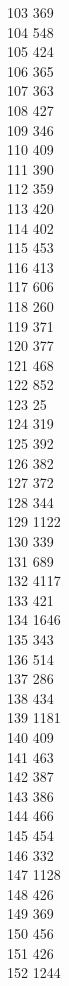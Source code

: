 { 103	369 \\
 104	548 \\
 105	424 \\
 106	365 \\
 107	363 \\
 108	427 \\
 109	346 \\
 110	409 \\
 111	390 \\
 112	359 \\
 113	420 \\
 114	402 \\
 115	453 \\
 116	413 \\
 117	606 \\
 118	260 \\
 119	371 \\
 120	377 \\
 121	468 \\
 122	852 \\
 123	25 \\
 124	319 \\
 125	392 \\
 126	382 \\
 127	372 \\
 128	344 \\
 129	1122 \\
 130	339 \\
 131	689 \\
 132	4117 \\
 133	421 \\
 134	1646 \\
 135	343 \\
 136	514 \\
 137	286 \\
 138	434 \\
 139	1181 \\
 140	409 \\
 141	463 \\
 142	387 \\
 143	386 \\
 144	466 \\
 145	454 \\
 146	332 \\
 147	1128 \\
 148	426 \\
 149	369 \\
 150	456 \\
 151	426 \\
 152	1244 \\
}
